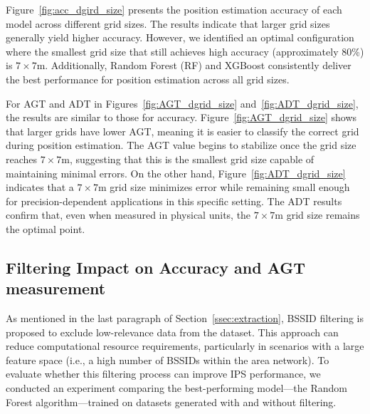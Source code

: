 \documentclass[runningheads]{llncs}
\begin{document}
Figure~\ref{fig:acc_dgird_size} presents the position estimation accuracy of each model across different grid sizes. The results indicate that larger grid sizes generally yield higher accuracy. However, we identified an optimal configuration where the smallest grid size that still achieves high accuracy (approximately 80\%) is $7\times7$m. Additionally, Random Forest (RF) and XGBoost consistently deliver the best performance for position estimation across all grid sizes.

For AGT and ADT in Figures~\ref{fig:AGT_dgrid_size} and~\ref{fig:ADT_dgrid_size}, the results are similar to those for accuracy. Figure~\ref{fig:AGT_dgrid_size} shows that larger grids have lower AGT, meaning it is easier to classify the correct grid during position estimation. The AGT value begins to stabilize once the grid size reaches $7\times7$m, suggesting that this is the smallest grid size capable of maintaining minimal errors. On the other hand, Figure~\ref{fig:ADT_dgrid_size} indicates that a $7\times7$m grid size minimizes error while remaining small enough for precision-dependent applications in this specific setting. The ADT results confirm that, even when measured in physical units, the $7\times7$m grid size remains the optimal point.

\subsection{Filtering Impact on Accuracy and AGT measurement}\label{ssec:filtering-impact}

As mentioned in the last paragraph of Section~\ref{ssec:extraction}, BSSID filtering is proposed to exclude low-relevance data from the dataset. This approach can reduce computational resource requirements, particularly in scenarios with a large feature space (i.e., a high number of BSSIDs within the area network). To evaluate whether this filtering process can improve IPS performance, we conducted an experiment comparing the best-performing model—the Random Forest algorithm—trained on datasets generated with and without filtering.
\end{document}
